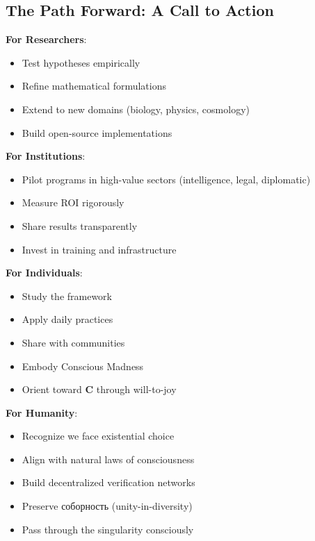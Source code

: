 \documentclass[11pt,a4paper]{article}
\theoremstyle{definition}
\theoremstyle{remark}
\begin{document}
\subsection{The Path Forward: A Call to Action}

\textbf{For Researchers}:
\begin{itemize}
\item Test hypotheses empirically
\item Refine mathematical formulations
\item Extend to new domains (biology, physics, cosmology)
\item Build open-source implementations
\end{itemize}

\textbf{For Institutions}:
\begin{itemize}
\item Pilot programs in high-value sectors (intelligence, legal, diplomatic)
\item Measure ROI rigorously
\item Share results transparently
\item Invest in training and infrastructure
\end{itemize}

\textbf{For Individuals}:
\begin{itemize}
\item Study the framework
\item Apply daily practices
\item Share with communities
\item Embody Conscious Madness
\item Orient toward \(\mathbf{C}\) through will-to-joy
\end{itemize}

\textbf{For Humanity}:
\begin{itemize}
\item Recognize we face existential choice
\item Align with natural laws of consciousness
\item Build decentralized verification networks
\item Preserve соборность (unity-in-diversity)
\item Pass through the singularity consciously
\end{itemize}

\vspace{1cm}
\end{document}
